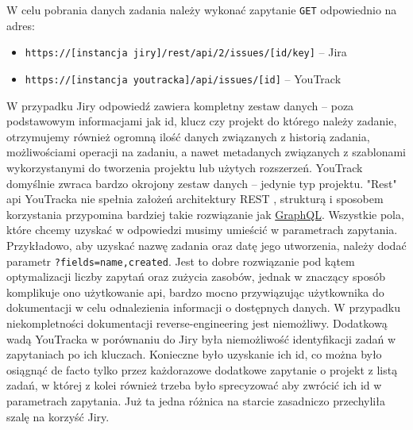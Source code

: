 W celu pobrania danych zadania należy wykonać zapytanie \texttt{GET} odpowiednio na adres:
\begin{itemize}
    \item \texttt{https://[instancja jiry]/rest/api/2/issues/[id/key]} -- Jira
    \item \texttt{https://[instancja youtracka]/api/issues/[id]} -- YouTrack
\end{itemize}

W przypadku Jiry odpowiedź zawiera kompletny zestaw danych -- poza podstawowym informacjami jak id, klucz czy projekt do którego należy zadanie, otrzymujemy również ogromną ilość
danych związanych z historią zadania, możliwościami operacji na zadaniu, a nawet metadanych związanych z szablonami wykorzystanymi do tworzenia projektu lub użytych rozszerzeń.
YouTrack domyślnie zwraca bardzo okrojony zestaw danych -- jedynie typ projektu. "Rest" api YouTracka nie spełnia założeń architektury REST \cite{RoyTFieldingRest}, strukturą i sposobem korzystania przypomina 
bardziej takie rozwiązanie jak \href{https://graphql.org/}{GraphQL}. Wszystkie pola, które chcemy uzyskać w odpowiedzi musimy umieścić w parametrach zapytania.
Przykładowo, aby uzyskać nazwę zadania oraz datę jego utworzenia, należy dodać parametr \texttt{?fields=name,created}. Jest to dobre rozwiązanie pod kątem optymalizacji liczby zapytań oraz zużycia zasobów, jednak
w znaczący sposób komplikuje ono użytkowanie api, bardzo mocno przywiązując użytkownika do dokumentacji w celu odnalezienia informacji o dostępnych danych. W przypadku niekompletności dokumentacji reverse-engineering jest niemożliwy.
Dodatkową wadą YouTracka w porównaniu do Jiry była niemożliwość identyfikacji zadań w zapytaniach po ich kluczach. Konieczne było uzyskanie ich id, co można było osiągnąć de facto tylko przez każdorazowe dodatkowe zapytanie o projekt z listą zadań, w której z kolei
również trzeba było sprecyzować aby zwrócić ich id w parametrach zapytania. Już ta jedna różnica na starcie zasadniczo przechyliła szalę na korzyść Jiry.

